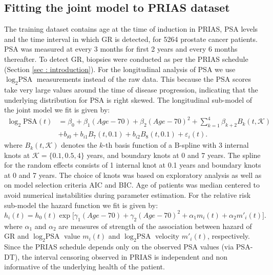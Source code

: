 \subsection{Fitting the joint model to PRIAS dataset}
\label{subsec : jm_fit_prias}
The training dataset contains age at the time of induction in PRIAS, PSA levels and the time interval in which GR is detected, for 5264 prostate cancer patients. PSA was measured at every 3 months for first 2 years and every 6 months thereafter. To detect GR, biopsies were conducted as per the PRIAS schedule (Section \ref{sec : introduction}). For the longitudinal analysis of PSA we use $\log_2 \mbox{PSA}$ measurements instead of the raw data. This because the PSA scores take very large values around the time of disease progression, indicating that the underlying distribution for PSA is right skewed. The longitudinal sub-model of the joint model we fit is given by:
\begin{equation}
\label{eq : long_model_prias}
\begin{aligned}
\log_2 \mbox{PSA}(t) &= \beta_0 + \beta_1 (Age-70) + \beta_2 (Age-70)^2 + \sum_{k=1}^4 \beta_{k+2} B_k(t,\mathcal{K})\\ 
&+  b_{i0} + b_{i1} B_7(t, 0.1) + b_{i2} B_8(t, 0.1) +
\varepsilon_i(t).
\end{aligned}
\end{equation}
where $B_k(t, \mathcal{K})$ denotes the $k$-th basis function of a B-spline with 3 internal knots at $\mathcal{K} =\{0.1, 0.5, 4\}$ years, and boundary knots at 0 and 7 years. The spline for the random effects consists of 1 internal knot at 0.1 years and boundary knots at 0 and 7 years. The choice of knots was based on exploratory analysis as well as on model selection criteria AIC and BIC. Age of patients was median centered to avoid numerical instabilities during parameter estimation. For the relative risk sub-model the hazard function we fit is given by:
\begin{equation}
\label{eq : hazard_prias}
h_i(t) = h_0(t) \exp\big[\gamma_1 (Age-70)  + \gamma_2 (Age-70)^2 + \alpha_1 m_i(t) + \alpha_2 m'_i(t)\big].
\end{equation}
where $\alpha_1$ and $\alpha_2$ are measures of strength of the association between hazard of GR and $\log_2 \mbox{PSA}$ value $m_i(t)$ and $\log_2 \mbox{PSA}$ velocity $m'_i(t)$, respectively. Since the PRIAS schedule depends only on the observed PSA values (via PSA-DT), the interval censoring observed in PRIAS is independent and non informative of the underlying health of the patient.


